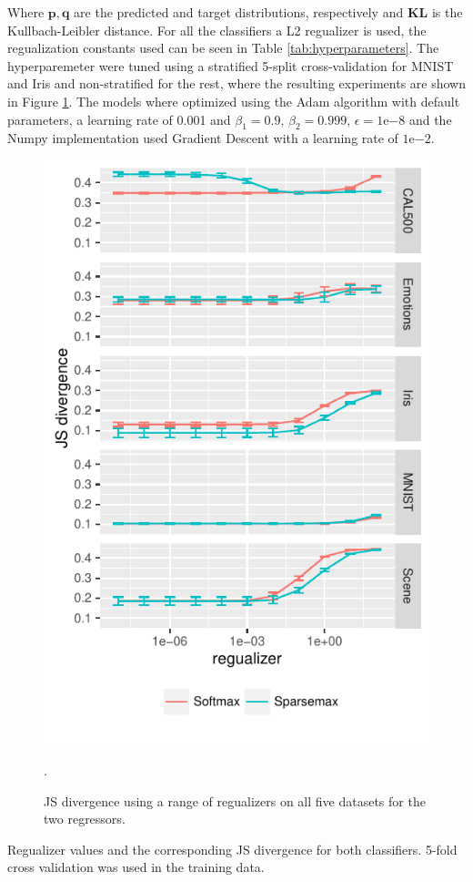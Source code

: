 Where $\mathbf{p}, \mathbf{q}$ are the predicted and target distributions, respectively and $\mathbf{KL}$ is the Kullbach-Leibler distance. For all the classifiers a L2 regualizer is used, the regualization constants used can be seen in Table \ref{tab:hyperparameters}. The hyperparemeter were tuned using a stratified 5-split cross-validation for MNIST and Iris and non-stratified for the rest, where the resulting experiments are shown in Figure \ref{fig:hyperparameters}. The models where optimized using the Adam algorithm with default parameters, a learning rate of 0.001 and $\beta_1=0.9, \, \beta_2 = 0.999, \, \epsilon = 1\mathrm{e}{-8}$ and the Numpy implementation used Gradient Descent with a learning rate of $1\mathrm{e}{-2}$.
\begin{figure}[H]
	\centering
	\includegraphics[scale=1]{figures/hyperparameter.pdf}
\caption{JS divergence using a range of regualizers on all five datasets for the two regressors.}
\label{fig:hyperparameters}.
\end{figure}
\begin{table}[H]
\centering

\caption{Regualizer values and the corresponding JS divergence for both classifiers. 5-fold cross validation was used in the training data.}
\label{tab:hyperparameters}
\end{table}

